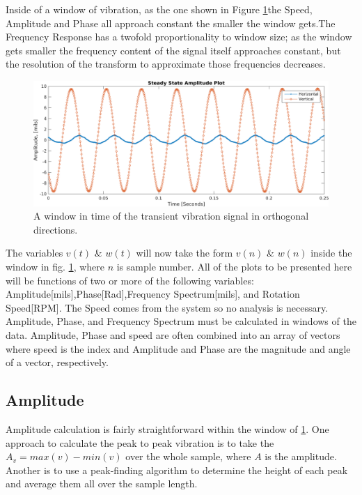 Inside of a window of vibration, as the one shown in Figure \ref{fig:WindowedData}the Speed, Amplitude and Phase all approach constant the smaller the window gets.The Frequency Response has a twofold proportionality to window size; as the window gets smaller the frequency content of the signal itself approaches constant, but the resolution of the transform to approximate those frequencies decreases.\par
\begin{figure}
	\centering
	\includegraphics[width=\linewidth]{./figures/SteadyS.png}
	\caption{A window in time of the transient vibration signal in orthogonal directions.}
	\label{fig:WindowedData}
\end{figure}
The variables $ v(t) $ \& $ w(t) $ will now take the form $ v(n) $ \& $ w(n) $ inside the window in fig. \ref{fig:WindowedData}, where $ n $ is sample number. All of the plots to be presented here will be functions of two or more of the following variables: Amplitude[mils],Phase[Rad],Frequency Spectrum[mils], and Rotation Speed[RPM]. The Speed comes from the system so no analysis is necessary. Amplitude, Phase, and Frequency Spectrum must be calculated in windows of the data. Amplitude, Phase and speed are often combined into an array of vectors where speed is the index and Amplitude and Phase are the magnitude and angle of a vector, respectively.\par 
\subsection{Amplitude}
Amplitude calculation is fairly straightforward within the window of \ref{fig:WindowedData}. One approach to calculate the peak to peak vibration is to take the $ A_v = max(v)-min(v) $ over the whole sample, where $ A $ is the amplitude. Another is to use a peak-finding algorithm to determine the height of each peak and average them all over the sample length.

